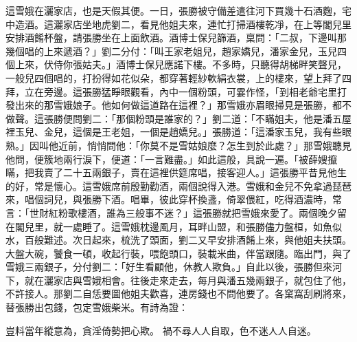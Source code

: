 這雪娥在灑家店，也是天假其便。一日，張勝被守備差遣往河下買幾十石酒麴，宅中造酒。這灑家店坐地虎劉二，看見他姐夫來，連忙打掃酒樓乾凈，在上等閣兒里安排酒餚杯盤，請張勝坐在上面飲酒。酒博士保兒篩酒，稟問：「二叔，下邊叫那幾個唱的上來遞酒？」劉二分付：「叫王家老姐兒，趙家嬌兒，潘家金兒，玉兒四個上來，伏侍你張姑夫。」酒博士保兒應諾下樓。不多時，只聽得胡梯畔笑聲兒，一般兒四個唱的，打扮得如花似朵，都穿著輕紗軟絹衣裳，上的樓來，望上拜了四拜，立在旁邊。這張勝猛睜眼觀看，內中一個粉頭，可霎作怪，「到相老爺宅里打發出來的那雪娥娘子。他如何做這道路在這裡？」那雪娥亦眉眼掃見是張勝，都不做聲。這張勝便問劉二：「那個粉頭是誰家的？」劉二道：「不瞞姐夫，他是潘五屋裡玉兒、金兒，這個是王老姐，一個是趙嬌兒。」張勝道：「這潘家玉兒，我有些眼熟。」因叫他近前，悄悄問他：「你莫不是雪姑娘麼？怎生到於此處？」那雪娥聽見他問，便簇地兩行淚下，便道：「一言難盡。」如此這般，具說一遍。「被薛嫂攛瞞，把我賣了二十五兩銀子，賣在這裡供筵席唱，接客迎人。」這張勝平昔見他生的好，常是懷心。這雪娥席前殷勤勸酒，兩個說得入港。雪娥和金兒不免拿過琵琶來，唱個詞兒，與張勝下酒。唱畢，彼此穿杯換盞，倚翠偎紅，吃得酒濃時，常言：「世財紅粉歌樓酒，誰為三般事不迷？」這張勝就把雪娥來愛了。兩個晚夕留在閣兒里，就一處睡了。這雪娥枕邊風月，耳畔山盟，和張勝儘力盤桓，如魚似水，百般難述。次日起來，梳洗了頭面，劉二又早安排酒餚上來，與他姐夫扶頭。大盤大碗，饕食一頓，收起行裝，喂飽頭口，裝載米曲，伴當跟隨。臨出門，與了雪娥三兩銀子，分付劉二：「好生看顧他，休教人欺負。」自此以後，張勝但來河下，就在灑家店與雪娥相會。往後走來走去，每月與潘五幾兩銀子，就包住了他，不許接人。那劉二自恁要圖他姐夫歡喜，連房錢也不問他要了。各窠窩刮刷將來，替張勝出包錢，包定雪娥柴米。有詩為證：

豈料當年縱意為，貪淫倚勢把心欺。
禍不尋人人自取，色不迷人人自迷。

